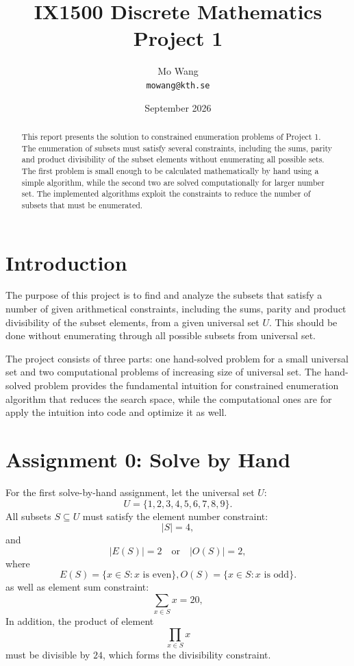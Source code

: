 \documentclass[11pt,a4paper]{article}
\title{
    \textbf{IX1500 Discrete Mathematics}\\
    Project 1
}
\author{
    Mo Wang\\
    \texttt{mowang@kth.se}
}
\date{September 2026}
\begin{document}
\maketitle

\begin{abstract}

This report presents the solution to constrained enumeration problems of Project 1. The enumeration of subsets must satisfy several constraints, including the sums, parity and product divisibility of the subset elements without enumerating all possible sets. The first problem is small enough to be calculated mathematically by hand using a simple algorithm, while the second two are solved computationally for larger number set. The implemented algorithms exploit the constraints to reduce the number of subsets that must be enumerated.

\end{abstract}

\section*{Introduction}

The purpose of this project is to find and analyze the subsets that satisfy a number of given arithmetical constraints, including the sums, parity and product divisibility of the subset elements, from a given universal set $U$. This should be done without enumerating through all possible subsets from universal set.

The project consists of three parts: one hand-solved problem for a small universal set and two computational problems of increasing size of universal set. The hand-solved problem provides the fundamental intuition for constrained enumeration algorithm that reduces the search space, while the computational ones are for apply the intuition into code and optimize it as well.

\section*{Assignment 0: Solve by Hand}

For the first solve-by-hand assignment, let the universal set $U$:
\[
U = \{1,2,3,4,5,6,7,8,9\}.
\]
All subsets $S \subseteq U$ must satisfy the element number constraint:
\[
|S| = 4,
\]
and
\[
|E(S)| = 2
\quad\text{or}\quad
|O(S)| = 2,
\]
where
\[
E(S) = \{x\in S : x \text{ is even}\},
O(S) = \{x\in S : x \text{ is odd}\}.
\]
as well as element sum constraint:
\[
\sum_{x\in S} x = 20,
\]
In addition, the product of element
\[
\prod_{x\in S}x
\]
must be divisible by $24$, which forms the divisibility constraint.
\end{document}

